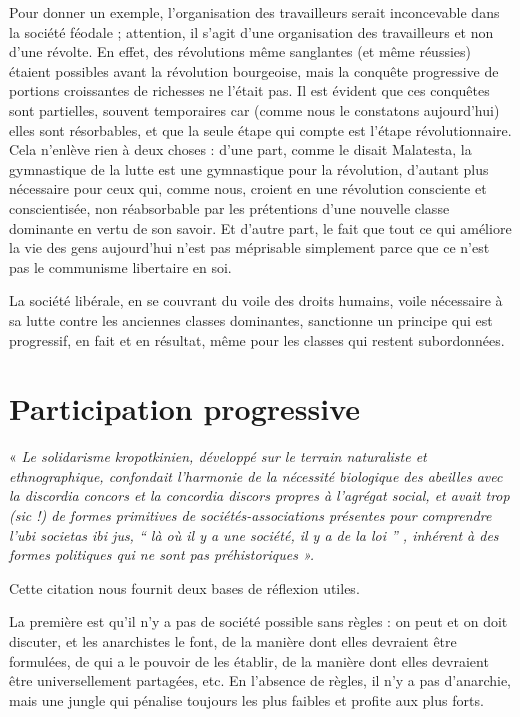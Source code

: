 Pour donner un exemple, l'organisation des travailleurs serait inconcevable dans la société féodale ; attention, il s'agit d'une organisation des travailleurs et non d'une révolte. En effet, des révolutions même sanglantes (et même réussies) étaient possibles avant la révolution bourgeoise, mais la conquête progressive de portions croissantes de richesses ne l'était pas. Il est évident que ces conquêtes sont partielles, souvent temporaires car (comme nous le constatons aujourd'hui) elles sont résorbables, et que la seule étape qui compte est l'étape révolutionnaire. Cela n'enlève rien à deux choses : d'une part, comme le disait Malatesta, la gymnastique de la lutte est une gymnastique pour la révolution, d'autant plus nécessaire pour ceux qui, comme nous, croient en une révolution consciente et conscientisée, non réabsorbable par les prétentions d'une nouvelle classe dominante en vertu de son savoir. Et d'autre part, le fait que tout ce qui améliore la vie des gens aujourd'hui n'est pas méprisable simplement parce que ce n'est pas le communisme libertaire en soi.

La société libérale, en se couvrant du voile des droits humains, voile nécessaire à sa lutte contre les anciennes classes dominantes, sanctionne un principe qui est progressif, en fait et en résultat, même pour les classes qui restent subordonnées.

\section{Participation progressive}

« \emph{Le solidarisme kropotkinien, développé sur le terrain naturaliste et ethnographique, confondait l'harmonie de la nécessité biologique des abeilles avec la discordia concors et la concordia discors propres à l'agrégat social, et avait trop (sic !) de formes primitives de sociétés-associations présentes pour comprendre l'ubi societas ibi jus, “ là où il y a une société, il y a de la loi ” , inhérent à des formes politiques qui ne sont pas préhistoriques ».}

Cette citation nous fournit deux bases de réflexion utiles.

La première est qu'il n'y a pas de société possible sans règles : on peut et on doit discuter, et les anarchistes le font, de la manière dont elles devraient être formulées, de qui a le pouvoir de les établir, de la manière dont elles devraient être universellement partagées, etc. En l'absence de règles, il n'y a pas d'anarchie, mais une jungle qui pénalise toujours les plus faibles et profite aux plus forts.

